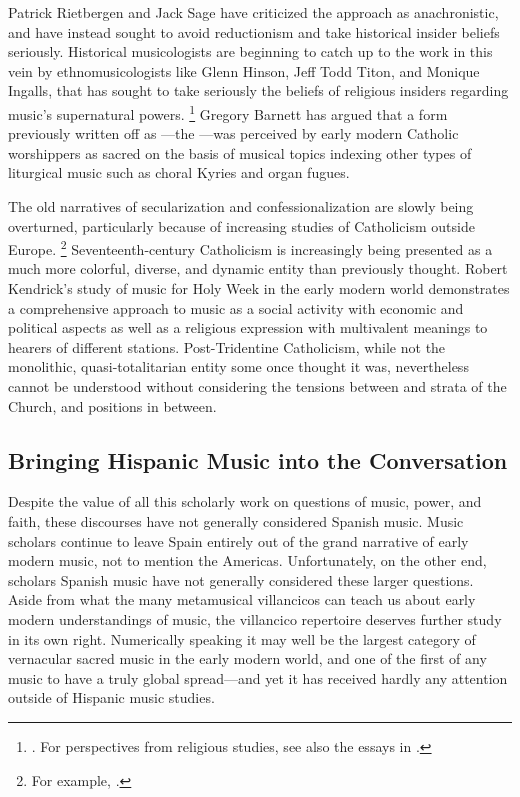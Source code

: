 Patrick Rietbergen and Jack Sage have criticized the  approach as anachronistic, and have instead sought to avoid reductionism and take historical insider beliefs seriously.%
	\autocites{Rietbergen:Power}{Sage:Instrumentum}
Historical musicologists are beginning to catch up to the work in this vein by ethnomusicologists like Glenn Hinson, Jeff Todd Titon, and Monique Ingalls, that has sought to take seriously the beliefs of religious insiders regarding music's supernatural powers.%
	\footnote{%
	\autocites{Hinson:Fire}{Titon:Powerhouse}{Ingalls:Awesome}.
	For perspectives from religious studies, see also the essays in \autocite{McCutcheon:InsiderOutsider}.
	}
Gregory Barnett has argued that a form previously written off as ---the ---was perceived by early modern Catholic worshippers as sacred on the basis of musical topics indexing other types of liturgical music such as choral Kyries and organ fugues.%
	\autocite{Barnett:Bolognese}

The old narratives of secularization and confessionalization are slowly being overturned, particularly because of increasing studies of Catholicism outside Europe.%
	\footnote{%
	For example, \autocites{Bailey:Art}{Dean:Inka}{Ditchfield:Dancing}.
	}
Seventeenth-century Catholicism is increasingly being presented as a much more colorful, diverse, and dynamic entity than previously thought.
Robert Kendrick's study of music for Holy Week in the early modern world demonstrates a comprehensive approach to music as a social activity with economic and political aspects as well as a religious expression with multivalent meanings to hearers of different stations.
	\autocite{Kendrick:Jeremiah}
Post-Tridentine Catholicism, while not the monolithic, quasi-totalitarian entity some once thought it was, nevertheless cannot be understood without considering the tensions between  and  strata of the Church, and positions in between.

\subsection{%
Bringing Hispanic Music into the Conversation
}

Despite the value of all this scholarly work on questions of music, power, and faith, these discourses have not generally considered Spanish music. 
Music scholars continue to leave Spain entirely out of the grand narrative of early modern music, not to mention the Americas.
Unfortunately, on the other end, scholars Spanish music have not generally considered these larger questions.
Aside from what the many metamusical villancicos can teach us about early modern understandings of music, the villancico repertoire deserves further study in its own right. 
Numerically speaking it may well be the largest category of vernacular sacred music in the early modern world, and one of the first of any music to have a truly global spread---and yet it has received hardly any attention outside of Hispanic music studies.

